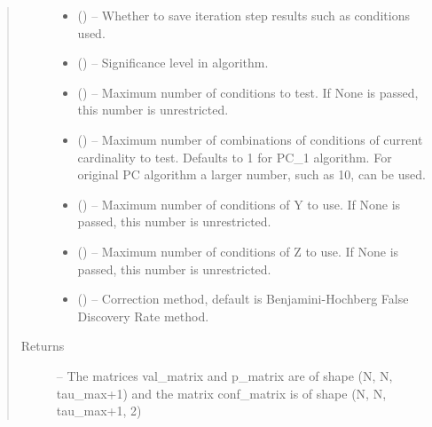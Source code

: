 \documentclass[letterpaper,10pt,english]{sphinxmanual}
\begin{document}
\begin{fulllineitems}
\begin{fulllineitems}
\begin{quote}
\begin{description}
\begin{itemize}
\item {} 
 (\sphinxstyleliteralemphasis{, }) -- Whether to save iteration step results such as conditions used.

\item {} 
 (\sphinxstyleliteralemphasis{, }) -- Significance level in algorithm.

\item {} 
 () -- Maximum number of conditions to test. If None is passed, this number
is unrestricted.

\item {} 
 (\sphinxstyleliteralemphasis{, }) -- Maximum number of combinations of conditions of current cardinality
to test. Defaults to 1 for PC\_1 algorithm. For original PC algorithm
a larger number, such as 10, can be used.

\item {} 
 () -- Maximum number of conditions of Y to use. If None is passed, this
number is unrestricted.

\item {} 
 () -- Maximum number of conditions of Z to use. If None is passed, this
number is unrestricted.

\item {} 
 (\sphinxstyleliteralemphasis{, }\sphinxstyleliteralemphasis{ (}\sphinxstyleliteralemphasis{)}\sphinxstyleliteralemphasis{}) -- Correction method, default is Benjamini-Hochberg False Discovery
Rate method.

\end{itemize}

\item[{Returns}] \leavevmode
{} -- The matrices val\_matrix and p\_matrix are of shape (N, N, tau\_max+1)
and the matrix conf\_matrix is of shape (N, N, tau\_max+1, 2)


\end{description}
\end{quote}
\end{fulllineitems}
\end{fulllineitems}
\end{document}
